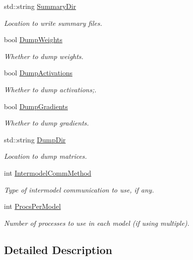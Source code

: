 \begin{DoxyCompactItemize}
std\+::string \hyperlink{classlbann_1_1TrainingParams_ad01ff40b34ff8b7adf4c547aa60ee87f}{Summary\+Dir}
\begin{DoxyCompactList}\small\item\em Location to write summary files. \end{DoxyCompactList}\item 
bool \hyperlink{classlbann_1_1TrainingParams_a58022c3da1e279e0a209cb5f90677aa7}{Dump\+Weights}
\begin{DoxyCompactList}\small\item\em Whether to dump weights. \end{DoxyCompactList}\item 
bool \hyperlink{classlbann_1_1TrainingParams_a4707689cbc2dd7cd45d05bf18026f2f4}{Dump\+Activations}
\begin{DoxyCompactList}\small\item\em Whether to dump activations;. \end{DoxyCompactList}\item 
bool \hyperlink{classlbann_1_1TrainingParams_a88d652f4579b464ce6d961712d7b0235}{Dump\+Gradients}
\begin{DoxyCompactList}\small\item\em Whether to dump gradients. \end{DoxyCompactList}\item 
std\+::string \hyperlink{classlbann_1_1TrainingParams_a56e113da8b3b5acc6a26ac710c1d77d8}{Dump\+Dir}
\begin{DoxyCompactList}\small\item\em Location to dump matrices. \end{DoxyCompactList}\item 
int \hyperlink{classlbann_1_1TrainingParams_aa30088e066d4d5cf2d2007667aef7a8a}{Intermodel\+Comm\+Method}
\begin{DoxyCompactList}\small\item\em Type of intermodel communication to use, if any. \end{DoxyCompactList}\item 
int \hyperlink{classlbann_1_1TrainingParams_afd0c134f11e1f44d8a07a55f86f3cfa0}{Procs\+Per\+Model}
\begin{DoxyCompactList}\small\item\em Number of processes to use in each model (if using multiple). \end{DoxyCompactList}\end{DoxyCompactItemize}


\subsection{Detailed Description}



